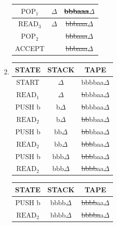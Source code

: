 \begin{solution}
\begin{enumerate}[label=\alph*)]
\begin{enumerate}[label=\arabic*)]
\begin{table}[H]
\begin{tabular}{|c|c|c|}
                    $\text{POP}_1$ & $\Delta$ &\sout{bbbaaa}$\Delta$\\
                    \hline
                    $\text{READ}_3$ & $\Delta$ & \sout{bbbaaa$\Delta$}\\
                    \hline
                    $\text{POP}_2$ & &\sout{bbbaaa$\Delta$}\\
                    \hline
                    ACCEPT & & \sout{bbbaaa$\Delta$}\\
                    \hline
                \end{tabular}
            \end{table}
            \item \begin{table}[H]
                \centering\begin{tabular}{|c|c|c|}
                    \hline
                    \textbf{STATE} & \textbf{STACK} & \textbf{TAPE} \\
                    \hline
                    START & $\Delta$ & bbbbaa$\Delta$\\
                    \hline
                    $\text{READ}_1$ & $\Delta$ & \sout{b}bbbaa$\Delta$\\
                    \hline
                    PUSH b & b$\Delta$ &\sout{b}bbbaa$\Delta$\\
                    \hline
                    $\text{READ}_2$ & b$\Delta$ & \sout{bb}bbaa$\Delta$\\
                    \hline
                    PUSH b & bb$\Delta$ &\sout{bb}bbaa$\Delta$\\
                    \hline
                    $\text{READ}_2$ & bb$\Delta$ & \sout{bbb}baa$\Delta$\\
                    \hline
                    PUSH b & bbb$\Delta$ &\sout{bbb}baa$\Delta$\\
                    \hline
                    $\text{READ}_2$ & bbb$\Delta$ & \sout{bbbb}aa$\Delta$\\
                    \hline
                \end{tabular}
                \quad
                \begin{tabular}{|c|c|c|}
                    \hline
                    \textbf{STATE} & \textbf{STACK} & \textbf{TAPE} \\
                    \hline
                    PUSH b & bbbb$\Delta$ &\sout{bbbb}aa$\Delta$\\
                    \hline
                    $\text{READ}_2$ & bbbb$\Delta$ & \sout{bbbba}a$\Delta$\\

\end{tabular}
\end{table}
\end{enumerate}
\end{enumerate}
\end{solution}
